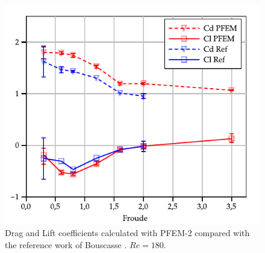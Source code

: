 \begin{figure}[ht]
  \centering
  \includegraphics[width=0.95\columnwidth]{images_10thspheric/CdCl_Re180_hd_0_55.pdf}
  \caption{Drag and Lift coefficients calculated with PFEM-2 compared with the reference work of Bouscasse \cite{Bouscasse14}. $Re=180$.} %
  \label{fg:CdCl}
\end{figure}
